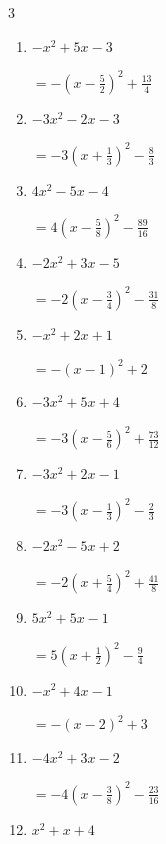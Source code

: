 \begin{multicols}{3}
\begin{enumerate}
  \item $-x^{2}+5x-3$

        $\displaystyle =-\left( x-\frac{5}{2}\right)^{2}+\frac{13}{4}$

  \item $-3x^{2}-2x-3$

        $\displaystyle =-3\left( x+\frac{1}{3}\right)^{2}-\frac{8}{3}$

\columnbreak %

\resetques

  \item $4x^{2}-5x-4$

        $\displaystyle =4\left( x-\frac{5}{8}\right)^{2}-\frac{89}{16}$

  \item $-2x^{2}+3x-5$

        $\displaystyle =-2\left( x-\frac{3}{4}\right)^{2}-\frac{31}{8}$

  \item $-x^{2}+2x+1$

        $\displaystyle =-\left( x-1\right)^{2}+2$

  \item $-3x^{2}+5x+4$

        $\displaystyle =-3\left( x-\frac{5}{6}\right)^{2}+\frac{73}{12}$

  \item $-3x^{2}+2x-1$

        $\displaystyle =-3\left( x-\frac{1}{3}\right)^{2}-\frac{2}{3}$

\columnbreak %

  \item $-2x^{2}-5x+2$

        $\displaystyle =-2\left( x+\frac{5}{4}\right)^{2}+\frac{41}{8}$

  \item $5x^{2}+5x-1$

        $\displaystyle =5\left( x+\frac{1}{2}\right)^{2}-\frac{9}{4}$

  \item $-x^{2}+4x-1$

        $\displaystyle =-\left( x-2\right)^{2}+3$

  \item $-4x^{2}+3x-2$

        $\displaystyle =-4\left( x-\frac{3}{8}\right)^{2}-\frac{23}{16}$

  \item $x^{2}+x+4$


\end{enumerate}
\end{multicols}
